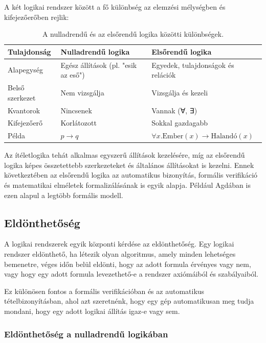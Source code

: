 A két logikai rendszer között a fő különbség az elemzési mélységben és kifejezőerőben rejlik:

\begin{table}[H]
\centering
\begin{tabular}{|l|l|l|}
\hline
\textbf{Tulajdonság} & \textbf{Nulladrendű logika} & \textbf{Elsőrendű logika} \\ \hline
Alapegység & Egész állítások (pl. "esik az eső") & Egyedek, tulajdonságok és relációk \\ \hline
Belső szerkezet & Nem vizsgálja & Vizsgálja és kezeli \\ \hline
Kvantorok & Nincsenek & Vannak (∀, ∃) \\ \hline
Kifejezőerő & Korlátozott & Sokkal gazdagabb \\ \hline
Példa & \(p \to q\) & \(\forall x. \text{Ember}(x) \to \text{Halandó}(x)\) \\ \hline
\end{tabular}
\caption{A nulladrendű és az elsőrendű logika közötti különbségek.}
\label{tab:logic_comparison}
\end{table}

Az ítéletlogika tehát alkalmas egyszerű állítások kezelésére, míg az elsőrendű logika képes összetettebb szerkezeteket és általános állításokat is kezelni. Ennek következtében az elsőrendű logika az automatikus bizonyítás, formális verifikáció és matematikai elméletek formalizálásának is egyik alapja. Például Agdában is ezen alapul a legtöbb formális modell.


\subsection{Eldönthetőség}

A logikai rendszerek egyik központi kérdése az eldönthetőség. Egy logikai rendszer eldönthető, ha létezik olyan algoritmus, amely minden lehetséges bemenetre, véges időn belül eldönti, hogy az adott formula érvényes vagy nem, vagy hogy egy adott formula levezethető-e a rendszer axiómáiból és szabályaiból.

Ez különösen fontos a formális verifikációban és az automatikus tételbizonyításban, ahol azt szeretnénk, hogy egy gép automatikusan meg tudja mondani, hogy egy adott logikai állítás igaz-e vagy sem.

\subsubsection{Eldönthetőség a nulladrendű logikában}

